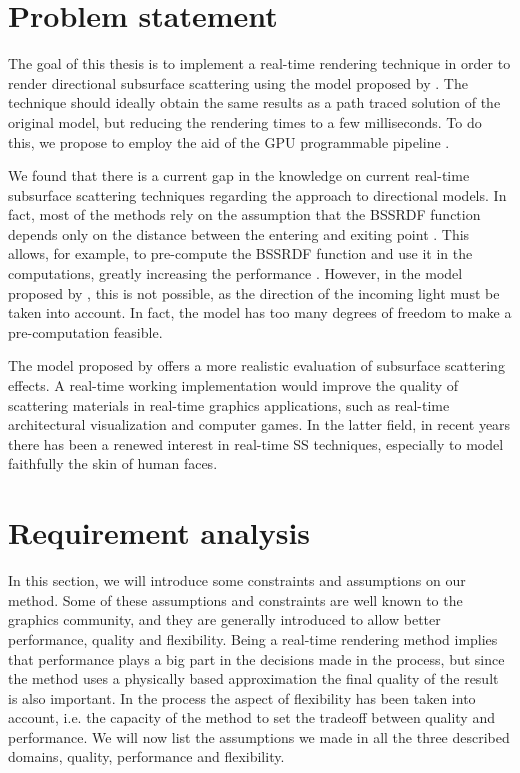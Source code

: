 \section{Problem statement}

The goal of this thesis is to implement a real-time rendering technique in order to render directional subsurface scattering using the model proposed by \cite{IMM2013-06646}. The technique should ideally obtain the same results as a path traced solution of the original model, but reducing the rendering times to a few milliseconds. To do this, we propose to employ the aid of the GPU programmable pipeline \citep{Fernando:2004:GGP:983868}. 

We found that there is a current gap in the knowledge on current real-time subsurface scattering techniques regarding the approach to directional models. In fact, most of the methods rely on the assumption that the BSSRDF function depends only on the distance between the entering and exiting point \cite{Jensen:2001:PMS:383259.383319}. This allows, for example, to pre-compute the BSSRDF function and use it in the computations, greatly increasing the performance \citep{4736459}. However, in the model proposed by \cite{IMM2013-06646}, this is not possible, as the direction of the incoming light must be taken into account. In fact, the model has too many degrees of freedom to make a pre-computation feasible. 

The model proposed by \cite{IMM2013-06646} offers a more realistic evaluation of subsurface scattering effects. A real-time working implementation would improve the quality of scattering materials in real-time graphics applications, such as real-time architectural visualization and computer games. In the latter field, in recent years there has been a renewed interest in real-time SS techniques, especially to model faithfully the skin of human faces. 

\section{Requirement analysis}

In this section, we will introduce some constraints and assumptions on our method. Some of these assumptions and constraints are well known to the graphics community, and they are generally introduced to allow better performance, quality and flexibility. Being a real-time rendering method implies that performance plays a big part in the decisions made in the process, but since the method uses a physically based approximation the final quality of the result is also important. In the process the aspect of flexibility has been taken into account, i.e. the capacity of the method to set the tradeoff between quality and performance. We will now list the assumptions we made in all the three described domains, quality, performance and flexibility. 


